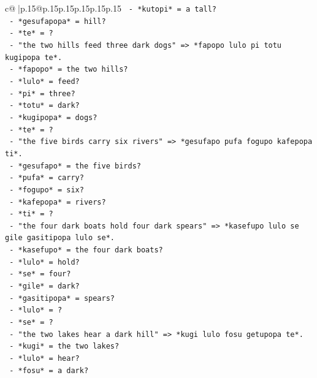 \documentclass{article}
\begin{document}
{\begin{supertabular}{c@{$\;$}|p{.15\linewidth}@{}p{.15\linewidth}p{.15\linewidth}p{.15\linewidth}p{.15\linewidth}p{.15\linewidth}}
{{{\texttt{              {-} *kutopi* = a tall?} \\
\texttt{              {-} *gesufapopa* = hill?} \\
\texttt{              {-} *te* = ?} \\
\texttt{            {-} "the two hills feed three dark dogs" => *fapopo lulo pi totu kugipopa te*.} \\
\texttt{              {-} *fapopo* = the two hills?} \\
\texttt{              {-} *lulo* = feed?} \\
\texttt{              {-} *pi* = three?} \\
\texttt{              {-} *totu* = dark?} \\
\texttt{              {-} *kugipopa* = dogs?} \\
\texttt{              {-} *te* = ?} \\
\texttt{            {-} "the five birds carry six rivers" => *gesufapo pufa fogupo kafepopa ti*.} \\
\texttt{              {-} *gesufapo* = the five birds?} \\
\texttt{              {-} *pufa* = carry?} \\
\texttt{              {-} *fogupo* = six?} \\
\texttt{              {-} *kafepopa* = rivers?} \\
\texttt{              {-} *ti* = ?} \\
\texttt{            {-} "the four dark boats hold four dark spears" => *kasefupo lulo se gile gasitipopa lulo se*.} \\
\texttt{              {-} *kasefupo* = the four dark boats?} \\
\texttt{              {-} *lulo* = hold?} \\
\texttt{              {-} *se* = four?} \\
\texttt{              {-} *gile* = dark?} \\
\texttt{              {-} *gasitipopa* = spears?} \\
\texttt{              {-} *lulo* = ?} \\
\texttt{              {-} *se* = ?} \\
\texttt{            {-} "the two lakes hear a dark hill" => *kugi lulo fosu getupopa te*.} \\
\texttt{              {-} *kugi* = the two lakes?} \\
\texttt{              {-} *lulo* = hear?} \\
\texttt{              {-} *fosu* = a dark?} \\
}}}
\end{supertabular}}
\end{document}
